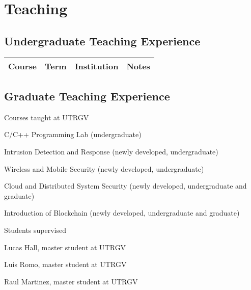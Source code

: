 
\section*{Teaching}

\subsection*{Undergraduate Teaching Experience}

\begin{longtable}{|p{1in}|p{1in}|p{0.8in}|p{2in}|}
    \hline
    \rowcolor{lightgray}
    \textbf{Course} &   \textbf{Term}   &   \textbf{Institution}    & \textbf{Notes}\\
    \hline
\end{longtable}

\subsection*{Graduate Teaching Experience}

\begin{compactitem}
    \item Courses taught at UTRGV
        \begin{compactitem}
            \item C/C++ Programming Lab (undergraduate)
            \item Intrusion Detection and Response (newly developed, undergraduate)
            \item Wireless and Mobile Security (newly developed, undergraduate)
            \item Cloud and Distributed System Security (newly developed, undergraduate and graduate)
            \item Introduction of Blockchain (newly developed, undergraduate and graduate)
        \end{compactitem}
    \item Students supervised
        \begin{compactitem}
            \item Lucas Hall, master student at UTRGV
            \item Luis Romo, master student at UTRGV
            \item Raul Martinez, master student at UTRGV
        \end{compactitem}   
\end{compactitem}


